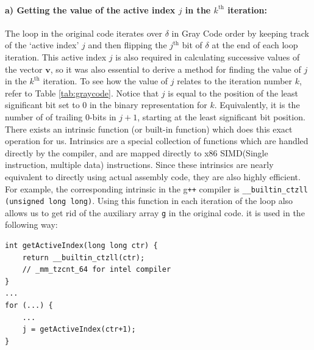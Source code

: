 \documentclass[11pt]{article}
\theoremstyle{theorem}
\theoremstyle{remark}
\theoremstyle{plain}
\theoremstyle{definition}
\begin{document}
\paragraph{a) Getting the value of the active index $j$ in the $k^{\text{th}}$ iteration:} The loop in the original code iterates over $\delta$ in Gray Code order by keeping track of the `active index' $j$ and then flipping the $j^{\text{th}}$ bit of $\delta$ at the end of each loop iteration. This active index $j$ is also required in calculating successive values of the vector $\mathbf{v}$, so it was also essential to derive a method for finding the value of $j$ in the $k^{\text{th}}$ iteration. To see how the value of $j$ relates to the iteration number $k$, refer to Table \ref{tab:graycode}. Notice that $j$ is equal to the position of the least significant bit set to 0 in the binary representation for $k$. Equivalently, it is the number of of trailing 0-bits in $j+1$, starting at the least significant bit position. There exists an intrinsic function (or built-in function) which does this exact operation for us. Intrinsics are a special collection of functions which are handled directly by the compiler, and are mapped directly to x86 SIMD(Single instruction, multiple data) instructions. Since these intrinsics are nearly equivalent to directly using actual assembly code, they are also highly efficient. For example, the corresponding intrinsic in the g\texttt{++} compiler is \texttt{__builtin_ctzll (unsigned long long)}. Using this function in each iteration of the loop also allows us to get rid of the auxiliary array \texttt{g} in the original code. it is used in the following way:
\begin{verbatim}
int getActiveIndex(long long ctr) {
	return __builtin_ctzll(ctr);
	// _mm_tzcnt_64 for intel compiler
}
...
for (...) {
    ...
    j = getActiveIndex(ctr+1);
}
\end{verbatim}
\end{document}
